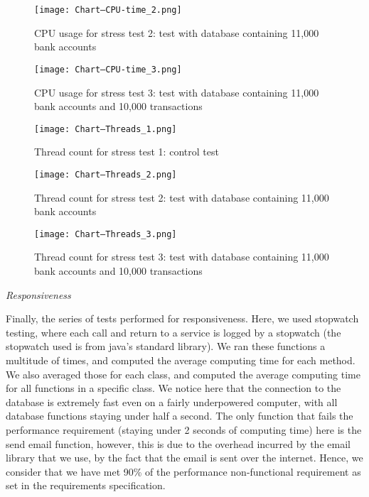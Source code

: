 \documentclass[12pt]{article}
\newcounter{req ID}
\begin{document}
\begin{figure}[htbp]
    \texttt{[image: Chart--CPU-time\_2.png]}
    \caption{CPU usage for stress test 2: test with database containing 11,000 bank accounts}
    \label{fig:CPU2}
\end{figure}

\begin{figure}[htbp]
    \texttt{[image: Chart--CPU-time\_3.png]}
    \caption{CPU usage for stress test 3: test with database containing 11,000 bank accounts and 10,000 transactions}
    \label{fig:CPU3}
\end{figure}


\begin{figure}[htbp]
    \texttt{[image: Chart--Threads\_1.png]}
    \caption{Thread count for stress test 1: control test}
    \label{fig:Thread1}
\end{figure}

\begin{figure}[htbp]
    \texttt{[image: Chart--Threads\_2.png]}
    \caption{Thread count for stress test 2: test with database containing 11,000 bank accounts}
    \label{fig:Thread2}
\end{figure}

\begin{figure}[htbp]
    \texttt{[image: Chart--Threads\_3.png]}
    \caption{Thread count for stress test 3: test with database containing 11,000 bank accounts and 10,000 transactions}
    \label{fig:Thread3}
\end{figure}

\clearpage



\textit{Responsiveness}

Finally, the series of tests performed for responsiveness. Here, we used stopwatch testing, where each call and return to a service is logged by a stopwatch (the stopwatch used is from java's standard library). We ran these functions a multitude of times, and computed the average computing time for each method. We also averaged those for each class, and computed the average computing time for all functions in a specific class. We notice here that the connection to the database is extremely fast even on a fairly underpowered computer, with all database functions staying under half a second. The only function that fails the performance requirement (staying under 2 seconds of computing time) here is the send email function, however, this is due to the overhead incurred by the email library that we use, by the fact that the email is sent over the internet. Hence, we consider that we have met 90\% of the performance non-functional requirement as set in the requirements specification.
\end{document}
